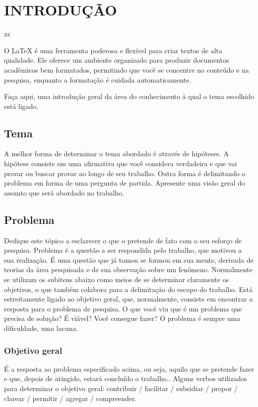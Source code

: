 
\chapter{INTRODUÇÃO}zz
\label{chap:introducao}

O \LaTeX{} é uma ferramenta poderosa e flexível para criar textos de alta qualidade. Ele oferece um ambiente organizado para produzir documentos acadêmicos bem formatados, permitindo que você se concentre no conteúdo e na pesquisa, enquanto a formatação é cuidada automaticamente.

Faça aqui, uma introdução geral da área do conhecimento à qual o tema escolhido
está ligado.

\section{Tema}
A melhor forma de determinar o tema abordado é através de hipóteses. A hipótese
consiste em uma afirmativa que você considera verdadeira e que vai provar ou
buscar provar ao longo de seu trabalho. Outra forma é delimitando o problema em
forma de uma pergunta de partida. Apresente uma visão geral do assunto que será
abordado no trabalho.

\section{Problema}
Dedique este tópico a esclarecer o que o pretende de fato com o seu esforço de
pesquisa. Problema é a questão a ser respondida pelo trabalho, que motivou a sua
realização. É uma questão que já tomou se formou em sua mente, derivada de
teorias da área pesquisada e de sua observação sobre um fenômeno.  Normalmente
se utilizam os subitens abaixo como meios de se determinar claramente os
objetivos, o que também colabora para a delimitação do escopo do trabalho. Está
estreitamente ligado ao objetivo geral, que, normalmente, consiste em encontrar
a resposta para o problema de pesquisa.  O que você viu que é um problema que
precisa de solução? É viável? Você consegue fazer? O problema é sempre uma
dificuldade, uma lacuna.

\subsection{Objetivo geral}
É a resposta ao problema especificado acima, ou seja, aquilo que se pretende
fazer e que, depois de atingido, estará concluído o trabalho.. Alguns verbos
utilizados para determinar o objetivo geral: contribuir / facilitar / subsidiar
/ propor / clarear / permitir / agregar / compreender.

